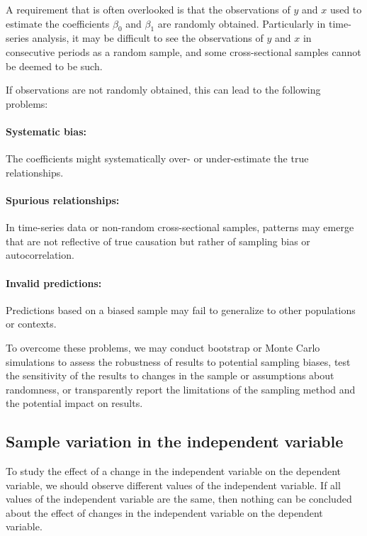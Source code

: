 A requirement that is often overlooked is that the observations of $y$ and $x$ used to estimate the coefficients $\beta_0$ and $\beta_1$ are randomly obtained. Particularly in time-series analysis, it may be difficult to see the observations of $y$ and $x$ in consecutive periods as a random sample, and some cross-sectional samples cannot be deemed to be such.

If observations are not randomly obtained, this can lead to the following problems:

\paragraph{Systematic bias:} The coefficients might systematically over- or under-estimate the true relationships.
\paragraph{Spurious relationships:} In time-series data or non-random cross-sectional samples, patterns may emerge that are not reflective of true causation but rather of sampling bias or autocorrelation.
\paragraph{Invalid predictions:} Predictions based on a biased sample may fail to generalize to other populations or contexts.

\bigskip
To overcome these problems, we may conduct bootstrap or Monte Carlo simulations to assess the robustness of results to potential sampling biases, test the sensitivity of the results to changes in the sample or assumptions about randomness, or transparently report the limitations of the sampling method and the potential impact on results.


\subsection{Sample variation in the independent variable} %
\label{sub:sample_variation_in_the_independent_variable}

To study the effect of a change in the independent variable on the dependent variable, we should observe different values of the independent variable. If all values of the independent variable are the same, then nothing can be concluded about the effect of changes in the independent variable on the dependent variable.

